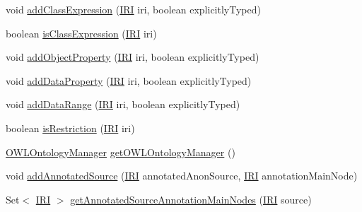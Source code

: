\begin{DoxyCompactItemize}
void \hyperlink{classorg_1_1coode_1_1owlapi_1_1rdfxml_1_1parser_1_1_o_w_l_r_d_f_consumer_a39c878cf528198edc93f9f92acc3c870}{add\-Class\-Expression} (\hyperlink{classorg_1_1semanticweb_1_1owlapi_1_1model_1_1_i_r_i}{I\-R\-I} iri, boolean explicitly\-Typed)
\item 
boolean \hyperlink{classorg_1_1coode_1_1owlapi_1_1rdfxml_1_1parser_1_1_o_w_l_r_d_f_consumer_a454900069eba9ecc2c97aad488b934be}{is\-Class\-Expression} (\hyperlink{classorg_1_1semanticweb_1_1owlapi_1_1model_1_1_i_r_i}{I\-R\-I} iri)
\item 
void \hyperlink{classorg_1_1coode_1_1owlapi_1_1rdfxml_1_1parser_1_1_o_w_l_r_d_f_consumer_aeab3f9d9f8def6e7035230658fac87fe}{add\-Object\-Property} (\hyperlink{classorg_1_1semanticweb_1_1owlapi_1_1model_1_1_i_r_i}{I\-R\-I} iri, boolean explicitly\-Typed)
\item 
void \hyperlink{classorg_1_1coode_1_1owlapi_1_1rdfxml_1_1parser_1_1_o_w_l_r_d_f_consumer_a4b7c0a09e0f372e560a3df5419d08d6b}{add\-Data\-Property} (\hyperlink{classorg_1_1semanticweb_1_1owlapi_1_1model_1_1_i_r_i}{I\-R\-I} iri, boolean explicitly\-Typed)
\item 
void \hyperlink{classorg_1_1coode_1_1owlapi_1_1rdfxml_1_1parser_1_1_o_w_l_r_d_f_consumer_a868702307803d86353af1a29136441c5}{add\-Data\-Range} (\hyperlink{classorg_1_1semanticweb_1_1owlapi_1_1model_1_1_i_r_i}{I\-R\-I} iri, boolean explicitly\-Typed)
\item 
boolean \hyperlink{classorg_1_1coode_1_1owlapi_1_1rdfxml_1_1parser_1_1_o_w_l_r_d_f_consumer_aef9855fe259ea2577025cadc485de3c3}{is\-Restriction} (\hyperlink{classorg_1_1semanticweb_1_1owlapi_1_1model_1_1_i_r_i}{I\-R\-I} iri)
\item 
\hyperlink{interfaceorg_1_1semanticweb_1_1owlapi_1_1model_1_1_o_w_l_ontology_manager}{O\-W\-L\-Ontology\-Manager} \hyperlink{classorg_1_1coode_1_1owlapi_1_1rdfxml_1_1parser_1_1_o_w_l_r_d_f_consumer_a80c241455f6d31cc3540a6099c082e85}{get\-O\-W\-L\-Ontology\-Manager} ()
\item 
void \hyperlink{classorg_1_1coode_1_1owlapi_1_1rdfxml_1_1parser_1_1_o_w_l_r_d_f_consumer_a6c68173241d69381f466855267c4b699}{add\-Annotated\-Source} (\hyperlink{classorg_1_1semanticweb_1_1owlapi_1_1model_1_1_i_r_i}{I\-R\-I} annotated\-Anon\-Source, \hyperlink{classorg_1_1semanticweb_1_1owlapi_1_1model_1_1_i_r_i}{I\-R\-I} annotation\-Main\-Node)
\item 
Set$<$ \hyperlink{classorg_1_1semanticweb_1_1owlapi_1_1model_1_1_i_r_i}{I\-R\-I} $>$ \hyperlink{classorg_1_1coode_1_1owlapi_1_1rdfxml_1_1parser_1_1_o_w_l_r_d_f_consumer_a8489566334a128c102eeb14389065323}{get\-Annotated\-Source\-Annotation\-Main\-Nodes} (\hyperlink{classorg_1_1semanticweb_1_1owlapi_1_1model_1_1_i_r_i}{I\-R\-I} source)

\end{DoxyCompactItemize}
